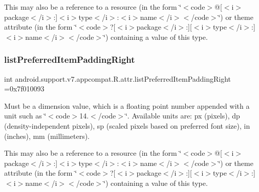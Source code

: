 This may also be a reference to a resource (in the form \char`\"{}$<$code$>$@\mbox{[}$<$i$>$package$<$/i$>$\+:\mbox{]}$<$i$>$type$<$/i$>$\+:$<$i$>$name$<$/i$>$$<$/code$>$\char`\"{}) or theme attribute (in the form \char`\"{}$<$code$>$?\mbox{[}$<$i$>$package$<$/i$>$\+:\mbox{]}\mbox{[}$<$i$>$type$<$/i$>$\+:\mbox{]}$<$i$>$name$<$/i$>$$<$/code$>$\char`\"{}) containing a value of this type. \mbox{\label{classandroid_1_1support_1_1v7_1_1appcompat_1_1R_1_1attr_a84cb41529bc5b6350af5f41bbea4e8cd}} 
\subsubsection{\texorpdfstring{list\+Preferred\+Item\+Padding\+Right}{listPreferredItemPaddingRight}}
{\footnotesize\ttfamily int android.\+support.\+v7.\+appcompat.\+R.\+attr.\+list\+Preferred\+Item\+Padding\+Right =0x7f010093\hspace{0.3cm}{\ttfamily [static]}}

Must be a dimension value, which is a floating point number appended with a unit such as \char`\"{}$<$code$>$14.\+5sp$<$/code$>$\char`\"{}. Available units are\+: px (pixels), dp (density-\/independent pixels), sp (scaled pixels based on preferred font size), in (inches), mm (millimeters). 

This may also be a reference to a resource (in the form \char`\"{}$<$code$>$@\mbox{[}$<$i$>$package$<$/i$>$\+:\mbox{]}$<$i$>$type$<$/i$>$\+:$<$i$>$name$<$/i$>$$<$/code$>$\char`\"{}) or theme attribute (in the form \char`\"{}$<$code$>$?\mbox{[}$<$i$>$package$<$/i$>$\+:\mbox{]}\mbox{[}$<$i$>$type$<$/i$>$\+:\mbox{]}$<$i$>$name$<$/i$>$$<$/code$>$\char`\"{}) containing a value of this type. \mbox{\label{classandroid_1_1support_1_1v7_1_1appcompat_1_1R_1_1attr_a112ee2368699d6914bca0aa5ac9bb096}} 
